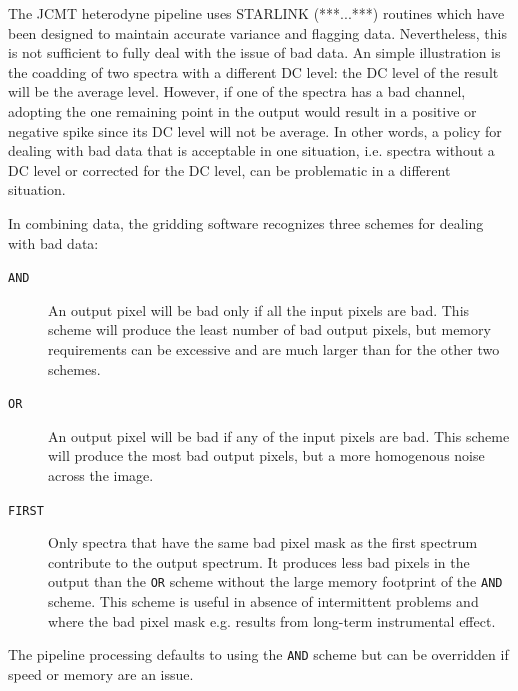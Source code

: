 \documentclass[final,authoryear,5p,times,twocolumn]{elsarticle}
\begin{document}
The JCMT heterodyne pipeline uses STARLINK (***...***) routines which
have been designed to maintain accurate variance and flagging data.
Nevertheless, this is not sufficient to fully deal with the issue of
bad data. An simple illustration is the coadding of two spectra with a
different DC level: the DC level of the result will be the average
level. However, if one of the spectra has a bad channel, adopting the
one remaining point in the output would result in a positive or
negative spike since its DC level will not be average. In other words,
a policy for dealing with bad data that is acceptable in one situation,
i.e. spectra without a DC level or corrected for the DC level, can be
problematic in a different situation.

In combining data, the gridding software recognizes three schemes for
dealing with bad data:
\begin{description}
\item[\texttt{AND}] An output pixel will be bad only if all the input
   pixels are bad. This scheme will produce the least number of bad
   output pixels, but memory requirements can be excessive and are much
   larger than for the other two schemes.
\item[\texttt{OR}] An output pixel will be bad if any of the input
   pixels are bad. This scheme will produce the most bad output pixels,
   but a more homogenous noise across the image.
\item[\texttt{FIRST}] Only spectra that have the same bad pixel mask
   as the first spectrum contribute to the output spectrum. It
   produces less bad pixels in the output than the \texttt{OR}
   scheme without the large memory footprint of the \texttt{AND} scheme.
   This scheme is useful in absence of intermittent problems and where
   the bad pixel mask e.g. results from long-term instrumental effect.
\end{description}

The pipeline processing defaults to using the \texttt{AND} scheme but
can be overridden if speed or memory are an issue.
\end{document}
